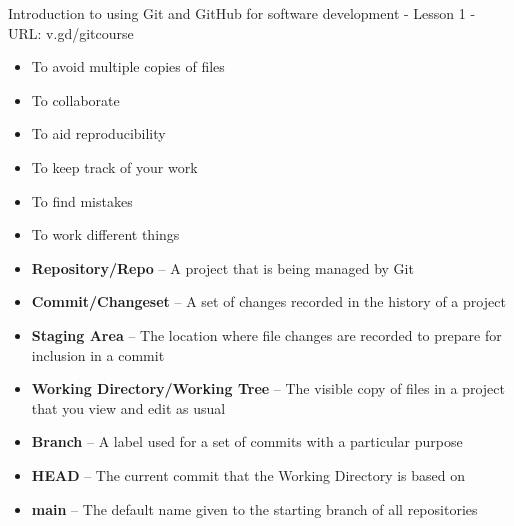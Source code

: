 \documentclass[9pt]{extarticle}
\def\itempad{-1pt}
\begin{document}
\thispagestyle{empty}

\begin{center}
  {\LARGE
  Introduction to using Git and GitHub for software development - Lesson 1 - URL: v.gd/gitcourse}\end{center}

\begin{navybox}[title=Why use version control?]
  \begin{multicols}{2}
    \begin{itemize}
      \itemsep\itempad
    \item To avoid multiple copies of files
    \item To collaborate
    \item To aid reproducibility
    \item To keep track of your work
    \item To find mistakes
    \item To work different things
    \end{itemize}
  \end{multicols}
\end{navybox}

\begin{bluebox}[title=Git Glossary]
  \begin{itemize}
    \itemsep\itempad
  \item \textbf{Repository/Repo} -- A project that is being managed by Git
  \item \textbf{Commit/Changeset} -- A set of changes recorded in the history of
    a project
  \item \textbf{Staging Area} -- The location where file changes are recorded to
    prepare for inclusion in a commit
  \item \textbf{Working Directory/Working Tree} -- The visible copy of files in a
    project that you view and edit as usual
  \item \textbf{Branch} -- A label used for a set of commits with a particular
    purpose
  \item \textbf{HEAD} -- The current commit that the Working Directory is based on
  \item \textbf{main} -- The default name given to the starting branch of all repositories
  \end{itemize}
\end{bluebox}
\end{document}
